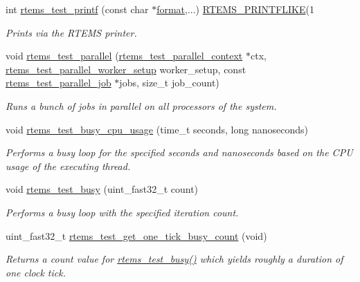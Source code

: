 \begin{DoxyCompactItemize}
int \mbox{\hyperlink{group__RTEMSTest_ga734557e139bda5d59546fe3bc28fbfa7}{rtems\+\_\+test\+\_\+printf}} (const char $\ast$\mbox{\hyperlink{structformat}{format}},...) \mbox{\hyperlink{group__RTEMSScoreBaseDefs_gac1811143c580ed4898c9eae63d5c5b8e}{R\+T\+E\+M\+S\+\_\+\+P\+R\+I\+N\+T\+F\+L\+I\+KE}}(1
\begin{DoxyCompactList}\small\item\em Prints via the R\+T\+E\+MS printer. \end{DoxyCompactList}\item 
void \mbox{\hyperlink{group__RTEMSTest_gaedc964c27c6e146a3606bb0ab2784d97}{rtems\+\_\+test\+\_\+parallel}} (\mbox{\hyperlink{structrtems__test__parallel__context}{rtems\+\_\+test\+\_\+parallel\+\_\+context}} $\ast$ctx, \mbox{\hyperlink{group__RTEMSTest_ga89f4019d001f65865999e823e35dfdcb}{rtems\+\_\+test\+\_\+parallel\+\_\+worker\+\_\+setup}} worker\+\_\+setup, const \mbox{\hyperlink{structrtems__test__parallel__job}{rtems\+\_\+test\+\_\+parallel\+\_\+job}} $\ast$jobs, size\+\_\+t job\+\_\+count)
\begin{DoxyCompactList}\small\item\em Runs a bunch of jobs in parallel on all processors of the system. \end{DoxyCompactList}\item 
void \mbox{\hyperlink{group__RTEMSTest_ga3226bd2aac6e7ea341e160f66a976a65}{rtems\+\_\+test\+\_\+busy\+\_\+cpu\+\_\+usage}} (time\+\_\+t seconds, long nanoseconds)
\begin{DoxyCompactList}\small\item\em Performs a busy loop for the specified seconds and nanoseconds based on the C\+PU usage of the executing thread. \end{DoxyCompactList}\item 
void \mbox{\hyperlink{group__RTEMSTest_ga4ef73d9b32877ff064b30f151e0d2098}{rtems\+\_\+test\+\_\+busy}} (uint\+\_\+fast32\+\_\+t count)
\begin{DoxyCompactList}\small\item\em Performs a busy loop with the specified iteration count. \end{DoxyCompactList}\item 
\mbox{\label{group__RTEMSTest_ga246dbecb60b96380488a2b99e722fed3}} 
uint\+\_\+fast32\+\_\+t \mbox{\hyperlink{group__RTEMSTest_ga246dbecb60b96380488a2b99e722fed3}{rtems\+\_\+test\+\_\+get\+\_\+one\+\_\+tick\+\_\+busy\+\_\+count}} (void)
\begin{DoxyCompactList}\small\item\em Returns a count value for \mbox{\hyperlink{group__RTEMSTest_ga4ef73d9b32877ff064b30f151e0d2098}{rtems\+\_\+test\+\_\+busy()}} which yields roughly a duration of one clock tick. \end{DoxyCompactList}\end{DoxyCompactItemize}
